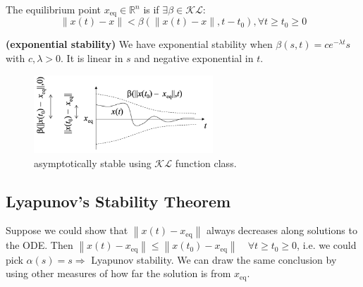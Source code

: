 \documentclass{article}
\newcommand{\bfs}[1]{\textbf{({#1}) }}
\begin{document}
\begin{defa}
 The equilibrium point $x_{\mathrm {eq}} \in \mathbb{R}^{n}$ is  if $\exists \beta \in \mathcal{K} \mathcal{L}$:
$$\|x(t)-x\|<\beta(\|x(t)-x\|, t-t_0), \forall t\ge t_0\ge0$$
\end{defa}
\begin{rema}\bfs{exponential stability}
We have exponential stability when
$\beta(s, t)=c e^{-\lambda t} s$ with $c, \lambda>0$. It is linear in $s$ and negative exponential in $t$.
\end{rema}


\begin{figure}[H]
    \centering
    \includegraphics[width=0.6\textwidth]{Figs/8.png}
    \caption{asymptotically stable using $\mathcal{KL}$ function class.}
\end{figure}


\subsection{Lyapunov’s Stability Theorem}
Suppose we could show that $\left\|x(t)-x_{\mathrm{eq}}\right\|$ always decreases along solutions to the ODE. Then
$\left\|x(t)-x_{\mathrm{eq}}\right\| \leq\left\|x\left(t_{0}\right)-x_{\mathrm{eq}}\right\|\quad \forall t \geq t_{0} \geq 0$, i.e.
we could pick $\alpha(s)=s \Rightarrow$ Lyapunov stability. We can draw the same conclusion by using other measures of how far the solution is from $x_{\mathrm {eq}}$.
\end{document}
